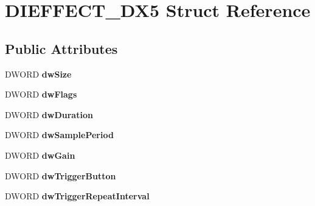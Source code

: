 \hypertarget{struct_d_i_e_f_f_e_c_t___d_x5}{\section{D\-I\-E\-F\-F\-E\-C\-T\-\_\-\-D\-X5 Struct Reference}
\label{struct_d_i_e_f_f_e_c_t___d_x5}
}
\subsection*{Public Attributes}
\begin{DoxyCompactItemize}
\item 
\hypertarget{struct_d_i_e_f_f_e_c_t___d_x5_aa8bf9ca3741b7dc6025da3d967ae6b8e}{D\-W\-O\-R\-D {\bfseries dw\-Size}}\label{struct_d_i_e_f_f_e_c_t___d_x5_aa8bf9ca3741b7dc6025da3d967ae6b8e}

\item 
\hypertarget{struct_d_i_e_f_f_e_c_t___d_x5_a9f6a7f7146984a5232c6774a5bda2969}{D\-W\-O\-R\-D {\bfseries dw\-Flags}}\label{struct_d_i_e_f_f_e_c_t___d_x5_a9f6a7f7146984a5232c6774a5bda2969}

\item 
\hypertarget{struct_d_i_e_f_f_e_c_t___d_x5_a70a1e5ac269503626dd27ce60f5a8456}{D\-W\-O\-R\-D {\bfseries dw\-Duration}}\label{struct_d_i_e_f_f_e_c_t___d_x5_a70a1e5ac269503626dd27ce60f5a8456}

\item 
\hypertarget{struct_d_i_e_f_f_e_c_t___d_x5_a89dbae8bde71041396a0bc03e3073773}{D\-W\-O\-R\-D {\bfseries dw\-Sample\-Period}}\label{struct_d_i_e_f_f_e_c_t___d_x5_a89dbae8bde71041396a0bc03e3073773}

\item 
\hypertarget{struct_d_i_e_f_f_e_c_t___d_x5_a4efb926bff40128a17083cbf0831d340}{D\-W\-O\-R\-D {\bfseries dw\-Gain}}\label{struct_d_i_e_f_f_e_c_t___d_x5_a4efb926bff40128a17083cbf0831d340}

\item 
\hypertarget{struct_d_i_e_f_f_e_c_t___d_x5_aa876bea2a0532f6dfb64fca56b9ab50c}{D\-W\-O\-R\-D {\bfseries dw\-Trigger\-Button}}\label{struct_d_i_e_f_f_e_c_t___d_x5_aa876bea2a0532f6dfb64fca56b9ab50c}

\item 
\hypertarget{struct_d_i_e_f_f_e_c_t___d_x5_ad9d298dfe6c5eec890d05dae842e2615}{D\-W\-O\-R\-D {\bfseries dw\-Trigger\-Repeat\-Interval}}\label{struct_d_i_e_f_f_e_c_t___d_x5_ad9d298dfe6c5eec890d05dae842e2615}


\end{DoxyCompactItemize}
